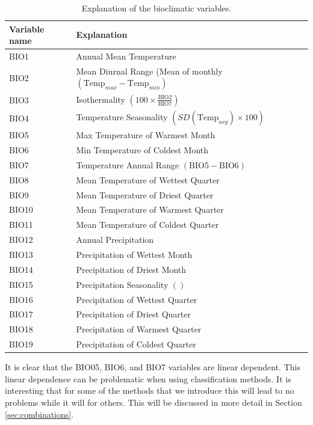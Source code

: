 \begin{table}[htb]
\centering
\begin{tabular}{ll}
\toprule
Variable name & Explanation \\ 
\midrule
BIO1 & Annual Mean Temperature \\
BIO2 & Mean Diurnal Range (Mean of monthly $\left( \text{Temp}_{max} - \text{Temp}_{min} \right)$ \\
BIO3 & Isothermality $\left( 100 \times \frac{\text{BIO2}}{\text{BIO7}} \right)$  \\
BIO4 & Temperature Seasonality $\left(SD(\text{Temp}_{avg}) \times 100\right)$ \\
BIO5 & Max Temperature of Warmest Month \\
BIO6 & Min Temperature of Coldest Month \\
BIO7 & Temperature Annual Range $\left(\text{BIO5} - \text{BIO6}\right)$ \\
BIO8 & Mean Temperature of Wettest Quarter \\
BIO9 & Mean Temperature of Driest Quarter \\
BIO10 & Mean Temperature of Warmest Quarter \\
BIO11 & Mean Temperature of Coldest Quarter \\
BIO12 & Annual Precipitation \\
BIO13 & Precipitation of Wettest Month \\
BIO14 & Precipitation of Driest Month \\
BIO15 & Precipitation Seasonality $\left( \right)$ \\
BIO16 & Precipitation of Wettest Quarter \\
BIO17 & Precipitation of Driest Quarter \\
BIO18 & Precipitation of Warmest Quarter \\
BIO19 & Precipitation of Coldest Quarter \\
\bottomrule
\end{tabular}
\caption{\label{table:Bioclim}Explanation of the bioclimatic variables.}
\end{table}

It is clear that the BIO05, BIO6, and BIO7 variables are linear dependent. This linear dependence can be problematic when using classification methods. It is interesting that for some of the methods that we introduce this will lead to no problems while it will for others. This will be discussed in more detail in Section \ref{sec:combinations}. \\ 

